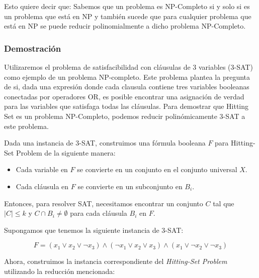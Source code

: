 \documentclass{estilo}
\begin{document}
Esto quiere decir que: Sabemos que un problema es NP-Completo si y solo si es un problema que está en NP y también sucede que para cualquier problema que está en NP se puede reducir polinomialmente a dicho problema NP-Completo.

\newpage
\subsubsection{Demostración}

Utilizaremos el problema de satisfacibilidad con cláusulas de 3 variables (3-SAT) como ejemplo de un problema NP-completo. Este problema plantea la pregunta de si, dada una expresión donde cada clausula contiene tres variables booleanas conectadas por operadores OR, es posible encontrar una asignación de verdad para las variables que satisfaga todas las cláusulas. Para demostrar que Hitting Set es un problema NP-Completo, podemos reducir polinómicamente 3-SAT a este problema.

Dada una instancia de 3-SAT, construimos una fórmula booleana \(F\) para Hitting-Set Problem de la siguiente manera:

\begin{itemize}
    \item Cada variable en \(F\) se convierte en un conjunto en el conjunto universal \(X\).
    \item Cada cláusula en \(F\) se convierte en un subconjunto en \(B_i\).
\end{itemize}


Entonces, para resolver SAT, necesitamos encontrar un conjunto \(C\) tal que \(|C| \leq k\) y \(C \cap B_i \neq \emptyset\) para cada cláusula \(B_i\) en \(F\).

Supongamos que tenemos la siguiente instancia de 3-SAT:

\[ F = (x_1 \lor x_2 \lor \neg x_3) \land (\neg x_1 \lor x_2 \lor x_3) \land (x_1 \lor \neg x_2 \lor \neg x_3) \]

Ahora, construimos la instancia correspondiente del \textit{Hitting-Set Problem} utilizando la reducción mencionada:
\end{document}
